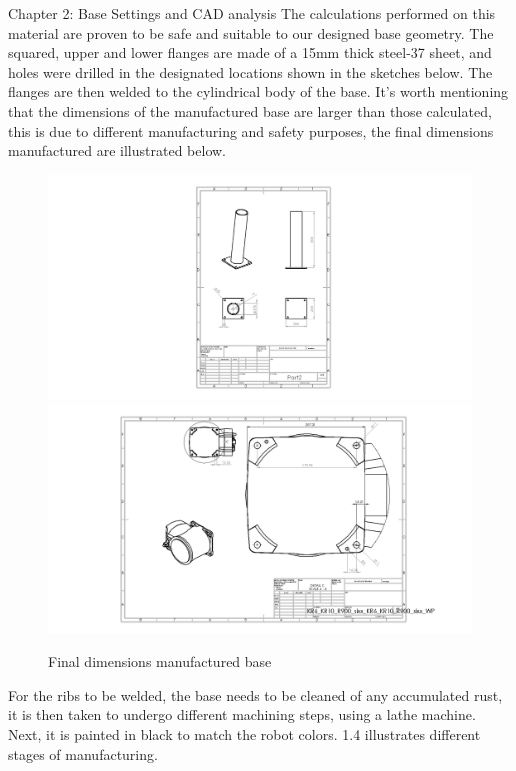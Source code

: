 \documentclass{book}
\begin{document}
\begin{chapter}{Chapter 2: Base Settings and CAD analysis}
The calculations performed on this material are proven to be safe and suitable to our designed base geometry. 
\vspace{0.2 cm}
\newline The squared, upper and lower flanges are made of a 15mm thick steel-37 sheet, and holes were drilled in the designated locations shown in the sketches below. The flanges are then welded to the cylindrical body of the base. It’s worth mentioning that the dimensions of the manufactured base are larger than those calculated, this is due to different manufacturing and safety purposes, the final dimensions manufactured are illustrated below.
\begin{figure}[H]
\begin{center}
	\includegraphics[scale=0.5]{BaseDim}
	\includegraphics[scale=0.5]{BaseDim2}
	\caption{Final dimensions manufactured base}
\end{center}
\end{figure}


For the ribs to be welded, the base needs to be cleaned of any accumulated rust, it is then taken to undergo different machining steps, using a lathe machine. Next, it is painted in black to match the robot colors.
\newline \figurename{1.4} illustrates different stages of manufacturing.


\end{chapter}
\end{document}
